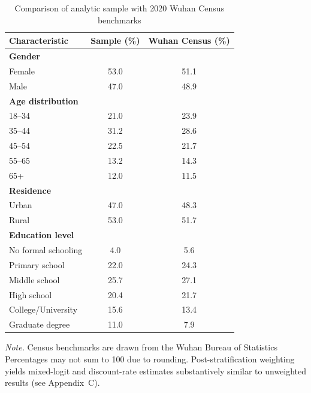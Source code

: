 \documentclass[doublespacing]{utdthesis}
\let\cite=\citep
\begin{document}
\begin{table}[htbp]
\centering
\caption{Comparison of analytic sample with 2020 Wuhan Census benchmarks}
\label{tab:table1_census_benchmark}
\begin{tabular}{lcc}
\toprule
Characteristic & Sample (\%) & Wuhan Census (\%) \\
\midrule
\textbf{Gender} \\
\hspace{3mm}Female & 53.0 & 51.1 \\
\hspace{3mm}Male   & 47.0 & 48.9 \\
\addlinespace

\textbf{Age distribution} \\
\hspace{3mm}18--34 & 21.0 & 23.9 \\
\hspace{3mm}35--44 & 31.2 & 28.6 \\
\hspace{3mm}45--54 & 22.5 & 21.7 \\
\hspace{3mm}55--65 & 13.2 & 14.3 \\
\hspace{3mm}65+    & 12.0 & 11.5 \\
\addlinespace

\textbf{Residence} \\
\hspace{3mm}Urban & 47.0 & 48.3 \\
\hspace{3mm}Rural & 53.0 & 51.7 \\
\addlinespace

\textbf{Education level} \\
\hspace{3mm}No formal schooling & 4.0  & 5.6 \\
\hspace{3mm}Primary school      & 22.0 & 24.3 \\
\hspace{3mm}Middle school       & 25.7 & 27.1 \\
\hspace{3mm}High school         & 20.4 & 21.7 \\
\hspace{3mm}College/University  & 15.6 & 13.4 \\
\hspace{3mm}Graduate degree     & 11.0 & 7.9 \\
\bottomrule
\end{tabular}

\vspace{2mm}
\begin{minipage}{0.92\linewidth}
\footnotesize \textit{Note.} Census benchmarks are drawn from the Wuhan Bureau of Statistics \cite{WuhanStats2021}
 Percentages may not sum to 100 due to rounding. Post-stratification weighting yields mixed-logit and discount-rate estimates substantively similar to unweighted results (see Appendix~C).
\end{minipage}
\end{table}
\end{document}
